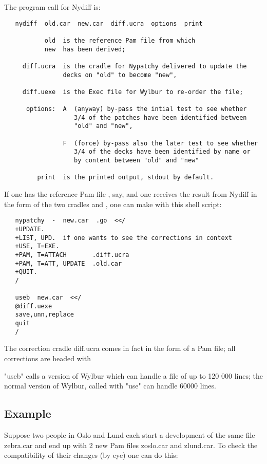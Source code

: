 The program call for Nydiff is:
\begin{verbatim}
   nydiff  old.car  new.car  diff.ucra  options  print

           old  is the reference Pam file from which
           new  has been derived;

     diff.ucra  is the cradle for Nypatchy delivered to update the
                decks on "old" to become "new",

     diff.uexe  is the Exec file for Wylbur to re-order the file;

      options:  A  (anyway) by-pass the intial test to see whether
                   3/4 of the patches have been identified between
                   "old" and "new",

                F  (force) by-pass also the later test to see whether
                   3/4 of the decks have been identified by name or
                   by content between "old" and "new"

         print  is the printed output, stdout by default.
\end{verbatim}

If one has the reference Pam file , say, and one receives
the result from Nydiff in the form of the two cradles 
and , one can make  with this shell script:
\begin{verbatim}
   nypatchy  -  new.car  .go  <</
   +UPDATE.
   +LIST, UPD.  if one wants to see the corrections in context
   +USE, T=EXE.
   +PAM, T=ATTACH       .diff.ucra
   +PAM, T=ATT, UPDATE  .old.car
   +QUIT.
   /

   useb  new.car  <</
   @diff.uexe
   save,unn,replace
   quit
   /
\end{verbatim}
The correction cradle diff.ucra comes in fact in the form of a
Pam file; all corrections are headed with 

"useb" calls a version of Wylbur which can handle a file of
up to 120 000 lines; the normal version of Wylbur, called with
"use" can handle 60000 lines.

\subsection*{Example}

Suppose two people in Oslo and Lund each start a development of the
same file zebra.car and end up with 2 new Pam files zoslo.car and
zlund.car. To check the compatibility of their changes (by eye)
one can do this:

